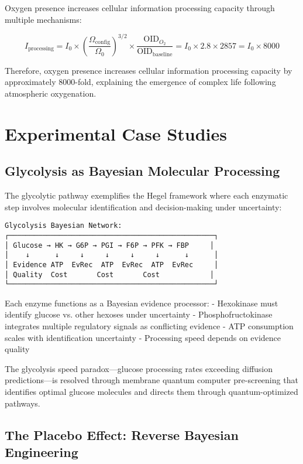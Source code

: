 \documentclass[12pt,a4paper]{article}
\begin{document}
Oxygen presence increases cellular information processing capacity through multiple mechanisms:

\begin{equation}
I_{\text{processing}} = I_0 \times \left(\frac{\Omega_{\text{config}}}{\Omega_0}\right)^{3/2} \times \frac{\text{OID}_{O_2}}{\text{OID}_{\text{baseline}}} = I_0 \times 2.8 \times 2857 = I_0 \times 8000
\end{equation}

Therefore, oxygen presence increases cellular information processing capacity by approximately 8000-fold, explaining the emergence of complex life following atmospheric oxygenation.

\section{Experimental Case Studies}

\subsection{Glycolysis as Bayesian Molecular Processing}

The glycolytic pathway exemplifies the Hegel framework where each enzymatic step involves molecular identification and decision-making under uncertainty:

\begin{verbatim}
Glycolysis Bayesian Network:
┌─────────────────────────────────────────────────┐
│ Glucose → HK → G6P → PGI → F6P → PFK → FBP     │
│    ↓      ↓     ↓     ↓     ↓     ↓      ↓      │
│ Evidence ATP  EvRec  ATP  EvRec  ATP  EvRec     │
│ Quality  Cost       Cost       Cost            │
└─────────────────────────────────────────────────┘
\end{verbatim}

Each enzyme functions as a Bayesian evidence processor:
- Hexokinase must identify glucose vs. other hexoses under uncertainty
- Phosphofructokinase integrates multiple regulatory signals as conflicting evidence
- ATP consumption scales with identification uncertainty
- Processing speed depends on evidence quality

The glycolysis speed paradox—glucose processing rates exceeding diffusion predictions—is resolved through membrane quantum computer pre-screening that identifies optimal glucose molecules and directs them through quantum-optimized pathways.

\subsection{The Placebo Effect: Reverse Bayesian Engineering}
\end{document}
